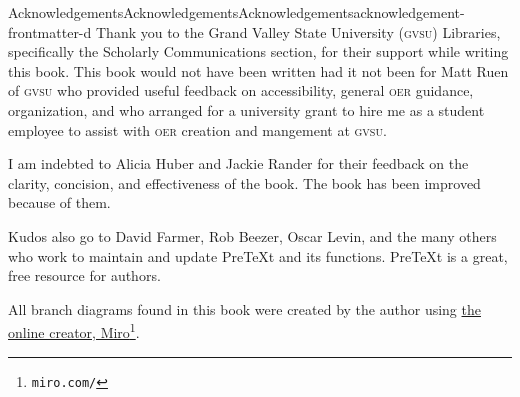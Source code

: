 \documentclass[twoside,10pt,]{book}
\newcommand{\initialism}[1]{\textsc{\MakeLowercase{#1}}}
\begin{document}
\thispagestyle{empty}
\null%
\clearpage
%
%
\typeout{************************************************}
\typeout{************************************************}
%
\begin{acknowledgement}{Acknowledgements}{Acknowledgements}{}{Acknowledgements}{}{}{acknowledgement-frontmatter-d}
Thank you to the Grand Valley State University (\initialism{GVSU}) Libraries, specifically the Scholarly Communications section, for their support while writing this book. This book would not have been written had it not been for Matt Ruen of \initialism{GVSU} who provided useful feedback on accessibility, general \initialism{OER} guidance, organization, and who arranged for a university grant to hire me as a student employee to assist with \initialism{OER} creation and mangement at \initialism{GVSU}.%
\par
I am indebted to Alicia Huber and Jackie Rander for their feedback on the clarity, concision, and effectiveness of the book. The book has been improved because of them.%
\par
Kudos also go to David Farmer, Rob Beezer, Oscar Levin, and the many others who work to maintain and update PreTeXt and its functions. PreTeXt is a great, free resource for authors.%
\par
All branch diagrams found in this book were created by the author using \href{https://miro.com/}{the online creator, Miro}\footnote{\nolinkurl{miro.com/}\label{fn-frontmatter-d-d-b}}.%
\end{acknowledgement}
%
%
\typeout{************************************************}
\typeout{************************************************}
%
\end{document}
